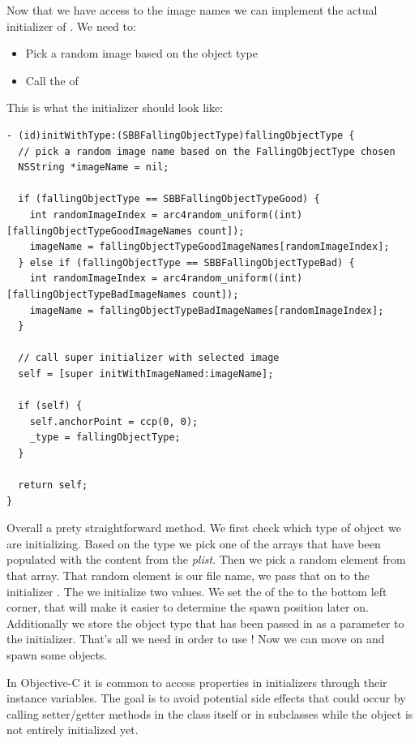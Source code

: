 Now that we have access to the image names we can implement the actual
initializer of . We need to:
\begin{itemize}
  \item Pick a random image based on the object type
  \item Call the  of \ccsprite{}
\end{itemize}

This is what the initializer should look like:
\begin{lstlisting}
- (id)initWithType:(SBBFallingObjectType)fallingObjectType {
  // pick a random image name based on the FallingObjectType chosen
  NSString *imageName = nil;
  
  if (fallingObjectType == SBBFallingObjectTypeGood) {
    int randomImageIndex = arc4random_uniform((int)[fallingObjectTypeGoodImageNames count]);
    imageName = fallingObjectTypeGoodImageNames[randomImageIndex];
  } else if (fallingObjectType == SBBFallingObjectTypeBad) {
    int randomImageIndex = arc4random_uniform((int)[fallingObjectTypeBadImageNames count]);
    imageName = fallingObjectTypeBadImageNames[randomImageIndex];
  }
  
  // call super initializer with selected image
  self = [super initWithImageNamed:imageName];
  
  if (self) {
    self.anchorPoint = ccp(0, 0);
    _type = fallingObjectType;
  }
  
  return self;
}
\end{lstlisting}
Overall a prety straightforward method. We first check which type of object we
are initializing. Based on the type we pick one of the arrays that have been
populated with the content from the \textit{plist}. Then we pick a random
element from that array. That random element is our file name, we pass that on
to the \ccsprite{} initializer . The we
initialize two values. We set the  of the
 to the bottom left corner, that will make it
easier to determine the spawn position later on. Additionally we store the
object type that has been passed in as a parameter to the initializer.
That's all we need in order to use ! Now we can
move on and spawn some objects.

\begin{details}[frametitle={Accessing properties
in initializers}] In Objective-C it is common to access properties in initializers through their
instance variables. The goal is to avoid potential side effects that could
occur by calling setter/getter methods in the class itself or in subclasses
while the object is not entirely initialized yet.
\end{details}

